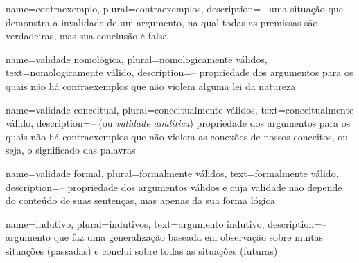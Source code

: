   {
  name=contraexemplo,
  plural=contraexemplos,
  description={-- uma situação que demonstra a invalidade de um argumento, na qual todas as premissas são verdadeiras, mas sua conclusão é falsa}
  }
  
  {
  name=validade nomológica,
  plural=nomologicamente válidos,
  text=nomologicamente válido,
  description={-- propriedade dos argumentos para os quais não há contraexemplos que não violem alguma lei da natureza}
  }
  
  {
  name=validade conceitual,
  plural=conceitualmente válidos,
  text=conceitualmente válido,
  description={-- (ou \textit{validade analítica}) propriedade dos argumentos para os quais não há contraexemplos que não violem as conexões de nossos conceitos, ou seja, o significado das palavras}
  }
  
  {
  name=validade formal,
  plural=formalmente válidos,
  text=formalmente válido,
  description={-- propriedade dos argumentos válidos e cuja validade não depende do conteúdo de suas sentenças, mas apenas da sua forma lógica}
  }
  
  {
  name=indutivo,
  plural=indutivos,
  text=argumento indutivo,
  description={-- argumento que faz uma generalização baseada em observação sobre muitas situações (passadas) e conclui sobre todas as situações (futuras)}
  }
  
